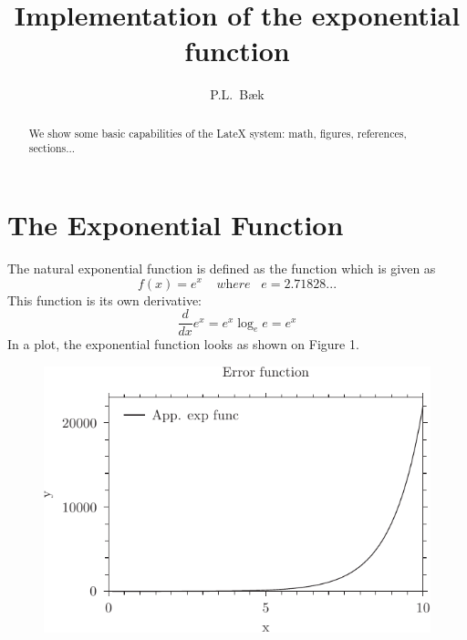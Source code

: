 \documentclass{article}
\title{Implementation of the exponential function}
\author{P.L.~Bæk}
\date{}
\begin{document}
\maketitle
\begin{abstract}
We show some basic capabilities of the LateX system: math, figures,
references, sections...
\end{abstract}
\section{The Exponential Function}
The natural exponential function is defined as the function which is given as
\begin{equation}
	f(x) = e^x \;\;\;\; \textit{where} \;\;\; e=2.71828...
\end{equation}
This function is its own derivative:
\begin{equation}
	\frac{d}{dx}e^x=e^x\log_e e = e^x
\end{equation}
In a plot, the exponential function looks as shown on Figure 1.
\begin{figure}
	\includegraphics{fig-pyxplot-2.pdf}
\end{figure}
\end{document}
